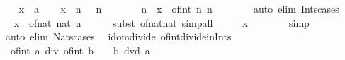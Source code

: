 \begin{isabellebody}
\ \ \isamarkupfalse%
\ x\ {\isacharcolon}{\kern0pt}{\isacharcolon}{\kern0pt}\ {\isacharprime}{\kern0pt}a\isanewline
\ \ \isamarkupfalse%
\ {\isachardoublequoteopen}x\ {\isasymin}\ {\isacharbraceleft}{\kern0pt}n\ {\isasymin}\ {\isasymint}{\isachardot}{\kern0pt}\ n\ {\isasymge}\ {}{\isacharbraceright}{\kern0pt}{\isachardoublequoteclose}\isanewline
\ \ \isamarkupfalse%
\ \isamarkupfalse%
\ n\ \ {\isachardoublequoteopen}x\ {\isacharequal}{\kern0pt}\ of{\isacharunderscore}{\kern0pt}int\ n{\isachardoublequoteclose}\ {\isachardoublequoteopen}n\ {\isasymge}\ {}{\isachardoublequoteclose}\isanewline
\ \ \ \ \isamarkupfalse%
\ {\isacharparenleft}{\kern0pt}auto\ elim{\isacharbang}{\kern0pt}{\isacharcolon}{\kern0pt}\ Ints{\isacharunderscore}{\kern0pt}cases{\isacharparenright}{\kern0pt}\isanewline
\ \ \isamarkupfalse%
\ \isamarkupfalse%
\ {\isachardoublequoteopen}x\ {\isacharequal}{\kern0pt}\ of{\isacharunderscore}{\kern0pt}nat\ {\isacharparenleft}{\kern0pt}nat\ n{\isacharparenright}{\kern0pt}{\isachardoublequoteclose}\isanewline
\ \ \ \ \isamarkupfalse%
\ {\isacharparenleft}{\kern0pt}subst\ of{\isacharunderscore}{\kern0pt}nat{\isacharunderscore}{\kern0pt}nat{\isacharparenright}{\kern0pt}\ simp{\isacharunderscore}{\kern0pt}all\isanewline
\ \ \isamarkupfalse%
\ \isamarkupfalse%
\ {\isachardoublequoteopen}x\ {\isasymin}\ {\isasymnat}{\isachardoublequoteclose}\isanewline
\ \ \ \ \isamarkupfalse%
\ simp\isanewline
{}\isamarkupfalse%
\ {\isacharparenleft}{\kern0pt}auto\ elim{\isacharbang}{\kern0pt}{\isacharcolon}{\kern0pt}\ Nats{\isacharunderscore}{\kern0pt}cases{\isacharparenright}{\kern0pt}%
\endisatagproof
{\isafoldproof}%
%
\isadelimproof
\isanewline
%
\endisadelimproof
\isanewline
{}\isamarkupfalse%
\ {\isacharparenleft}{\kern0pt}\ idom{\isacharunderscore}{\kern0pt}divide{\isacharparenright}{\kern0pt}\ of{\isacharunderscore}{\kern0pt}int{\isacharunderscore}{\kern0pt}divide{\isacharunderscore}{\kern0pt}in{\isacharunderscore}{\kern0pt}Ints{\isacharcolon}{\kern0pt}\ \isanewline
\ \ {\isachardoublequoteopen}of{\isacharunderscore}{\kern0pt}int\ a\ div\ of{\isacharunderscore}{\kern0pt}int\ b\ {\isasymin}\ {\isasymint}{\isachardoublequoteclose}\ \ {\isachardoublequoteopen}b\ dvd\ a{\isachardoublequoteclose}\isanewline
%
\isadelimproof
%
\endisadelimproof
%
\isatagproof
{}\isamarkupfalse%

\end{isabellebody}
